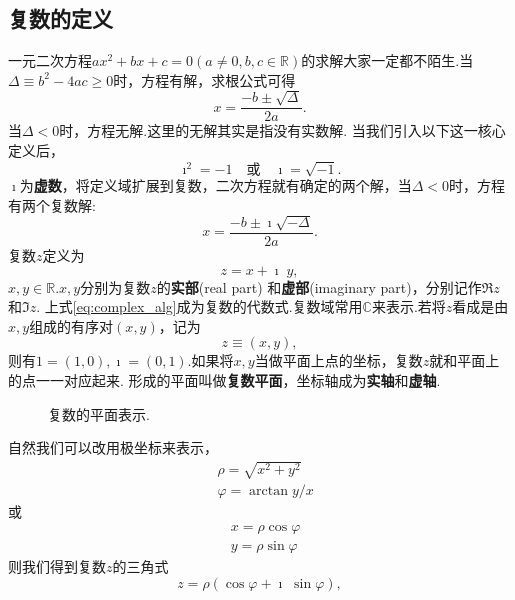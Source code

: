 


\subsection{复数的定义}
一元二次方程$a x^2 + b x + c = 0 (a\neq 0, b,c \in \mathbb{R})$的求解大家一定都不陌生.当$\Delta \equiv b^2 - 4 a c \geq 0$时，方程有解，求根公式可得
\begin{equation}
    x = \frac{-b \pm \sqrt{\Delta}}{2a} .
\end{equation}
当$\Delta < 0$时，方程无解.这里的无解其实是指没有实数解.
当我们引入以下这一核心定义后，
\begin{equation}
    \imath ^2 = -1 \quad \textrm{或} \quad \imath = \sqrt{-1} . 
\end{equation}
$\imath$为{\bf 虚数}，将定义域扩展到复数，二次方程就有确定的两个解，当$\Delta < 0$时，方程有两个复数解:
\begin{equation}
    x = \frac{-b \pm \imath \sqrt{-\Delta}}{2a} .
\end{equation}
复数$z$定义为
\begin{equation}
    \label{eq:complex_alg}
    z = x + \imath \; y ,
\end{equation}
$x,y \in {\mathbb{R}}$.$x,y$分别为复数$z$的{\bf 实部}(real part) 和{\bf 虚部}(imaginary part)，分别记作$\Re z$和$\Im z$.
上式\eqref{eq:complex_alg}成为复数的代数式.复数域常用$\mathbb{C}$来表示.若将$z$看成是由$x,y$组成的有序对$(x,y)$，记为
\begin{equation}
    z \equiv (x,y),
\end{equation}
则有$1 = (1,0), \imath = (0, 1)$.如果将$x,y$当做平面上点的坐标，复数$z$就和平面上的点一一对应起来.
形成的平面叫做{\bf 复数平面}，坐标轴成为{\bf 实轴}和{\bf 虚轴}.
\begin{figure}[htb]
    \centering
    
  \caption{复数的平面表示.} \label{fig:complex_plane}
\end{figure} 
自然我们可以改用极坐标来表示，
\begin{align}
    & \rho = \sqrt{x^2 + y^2}\\
    & \varphi = \arctan y/x
\end{align}
或
\begin{align}
    & x = \rho \cos\varphi \\
    & y = \rho \sin\varphi 
\end{align}
则我们得到复数$z$的三角式
\begin{equation}
    z = \rho (\cos\varphi +  \imath\; \sin\varphi) ,
\end{equation}
